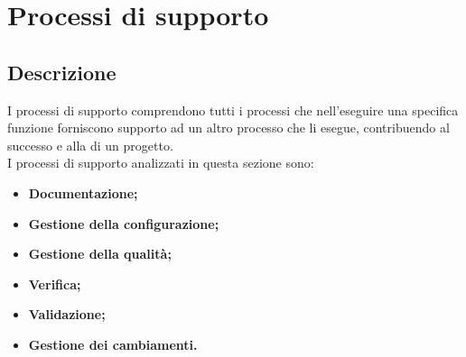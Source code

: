 \section{Processi di supporto}\label{ProcSup}
\subsection{Descrizione}\label{PSup_Descrizione}
I processi di supporto comprendono tutti i processi che nell'eseguire una specifica funzione forniscono supporto ad un altro processo che li esegue, contribuendo al successo e alla  di un progetto. \\
I processi di supporto analizzati in questa sezione sono:
\begin{itemize}
	\item \textbf{Documentazione;}
	\item \textbf{Gestione della configurazione;}
	\item \textbf{Gestione della qualità;}
	\item \textbf{Verifica;}
	\item \textbf{Validazione;}
	\item \textbf{Gestione dei cambiamenti.}
\end{itemize}


\newpage

\newpage

\newpage

\newpage

\newpage
